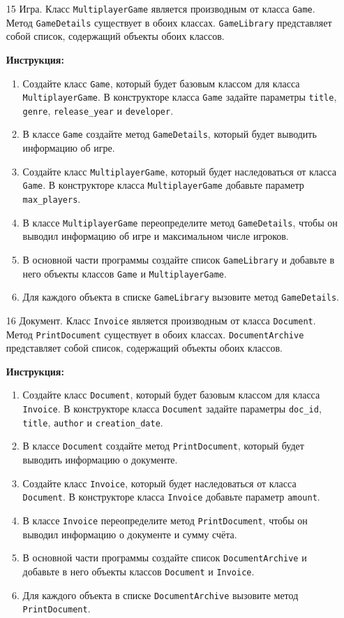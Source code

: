 \begin{enumerate}
\item[15]
Игра. Класс \texttt{MultiplayerGame} является производным от класса \texttt{Game}. Метод \texttt{GameDetails} существует в обоих классах. \texttt{GameLibrary} представляет собой список, содержащий объекты обоих классов.

\textbf{Инструкция:}
\begin{enumerate}
    \item Создайте класс \texttt{Game}, который будет базовым классом для класса \texttt{MultiplayerGame}. В конструкторе класса \texttt{Game} задайте параметры \texttt{title}, \texttt{genre}, \texttt{release\_year} и \texttt{developer}.
    \item В классе \texttt{Game} создайте метод \texttt{GameDetails}, который будет выводить информацию об игре.
    \item Создайте класс \texttt{MultiplayerGame}, который будет наследоваться от класса \texttt{Game}. В конструкторе класса \texttt{MultiplayerGame} добавьте параметр \texttt{max\_players}.
    \item В классе \texttt{MultiplayerGame} переопределите метод \texttt{GameDetails}, чтобы он выводил информацию об игре и максимальном числе игроков.
    \item В основной части программы создайте список \texttt{GameLibrary} и добавьте в него объекты классов \texttt{Game} и \texttt{MultiplayerGame}.
    \item Для каждого объекта в списке \texttt{GameLibrary} вызовите метод \texttt{GameDetails}.
\end{enumerate}

\item[16]
Документ. Класс \texttt{Invoice} является производным от класса \texttt{Document}. Метод \texttt{PrintDocument} существует в обоих классах. \texttt{DocumentArchive} представляет собой список, содержащий объекты обоих классов.

\textbf{Инструкция:}
\begin{enumerate}
    \item Создайте класс \texttt{Document}, который будет базовым классом для класса \texttt{Invoice}. В конструкторе класса \texttt{Document} задайте параметры \texttt{doc\_id}, \texttt{title}, \texttt{author} и \texttt{creation\_date}.
    \item В классе \texttt{Document} создайте метод \texttt{PrintDocument}, который будет выводить информацию о документе.
    \item Создайте класс \texttt{Invoice}, который будет наследоваться от класса \texttt{Document}. В конструкторе класса \texttt{Invoice} добавьте параметр \texttt{amount}.
    \item В классе \texttt{Invoice} переопределите метод \texttt{PrintDocument}, чтобы он выводил информацию о документе и сумму счёта.
    \item В основной части программы создайте список \texttt{DocumentArchive} и добавьте в него объекты классов \texttt{Document} и \texttt{Invoice}.
    \item Для каждого объекта в списке \texttt{DocumentArchive} вызовите метод \texttt{PrintDocument}.
\end{enumerate}


\end{enumerate}
